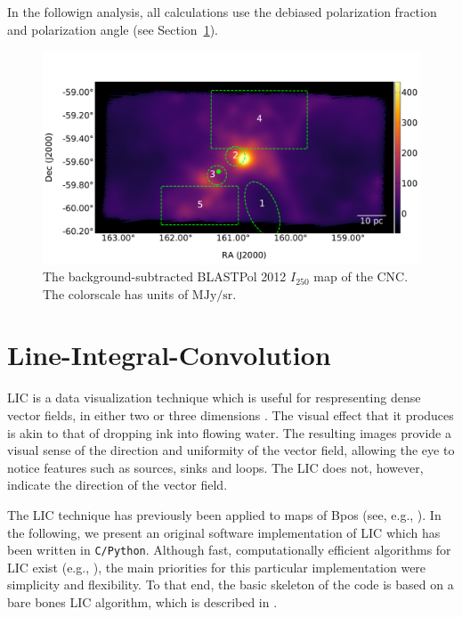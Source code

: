 In the followign analysis, all calculations use the debiased polarization fraction and polarization angle (see Section~\ref{LIC}).

\begin{figure}[!htbp]
\centering
\includegraphics[width=\textwidth]{figures/carina/carina_I250}
\caption[~The background-subtracted BLASTPol 2012  map of the CNC.]{The background-subtracted BLASTPol 2012 $I_{250}$ map of the CNC. The colorscale has units of $\mathrm{MJy}/\mathrm{sr}$.}
\label{fig:I250}
\end{figure}

\section{Line-Integral-Convolution}\label{LIC}

LIC is a data visualization technique which is useful for respresenting dense vector fields, in either two or three dimensions \citep{cabral1993imaging}. The visual effect that it produces is akin to that of dropping ink into flowing water. The resulting images provide a visual sense of the direction and uniformity of the vector field, allowing the eye to notice features such as sources, sinks and loops. The LIC does not, however, indicate the direction of the vector field.

The LIC technique has previously been applied to maps of \gls{Bpos} (see, e.g., \citet{ade2016planck}). In the following, we present an original software implementation of LIC which has been written in \texttt{C/Python}. Although fast, computationally efficient algorithms for LIC exist (e.g., \citet{stalling1995fast}), the main priorities for this particular implementation were simplicity and flexibility. To that end, the basic skeleton of the code is based on a bare bones LIC algorithm, which is described in \citet{ma1996texture}.

